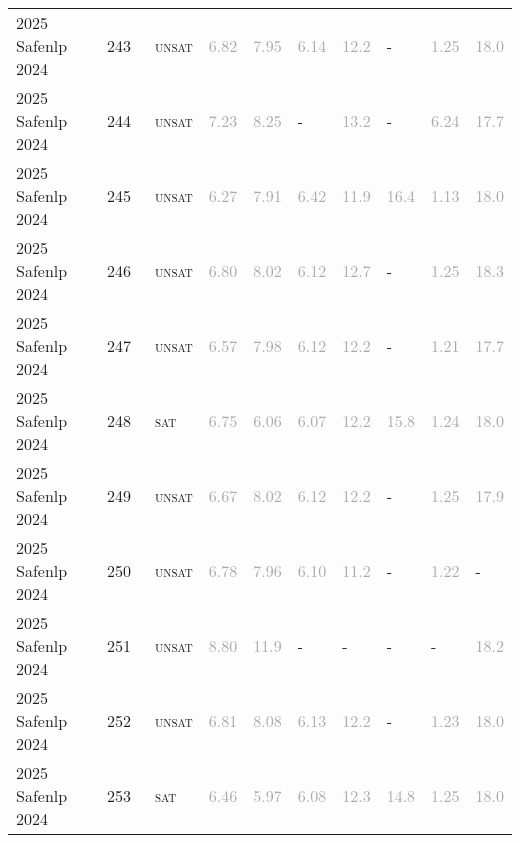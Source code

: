 \begin{center}
{\begin{longtable}{@{}llllllllll@{}}
2025 Safenlp 2024 & 243 & ~\textsc{unsat} & \textcolor{darkgray}{6.82} & \textcolor{darkgray}{7.95} & \textcolor{darkgray}{6.14} & \textcolor{darkgray}{12.2} & - & \textcolor{darkgray}{1.25} & \textcolor{darkgray}{18.0} \\
2025 Safenlp 2024 & 244 & ~\textsc{unsat} & \textcolor{darkgray}{7.23} & \textcolor{darkgray}{8.25} & - & \textcolor{darkgray}{13.2} & - & \textcolor{darkgray}{6.24} & \textcolor{darkgray}{17.7} \\
2025 Safenlp 2024 & 245 & ~\textsc{unsat} & \textcolor{darkgray}{6.27} & \textcolor{darkgray}{7.91} & \textcolor{darkgray}{6.42} & \textcolor{darkgray}{11.9} & \textcolor{darkgray}{16.4} & \textcolor{darkgray}{1.13} & \textcolor{darkgray}{18.0} \\
2025 Safenlp 2024 & 246 & ~\textsc{unsat} & \textcolor{darkgray}{6.80} & \textcolor{darkgray}{8.02} & \textcolor{darkgray}{6.12} & \textcolor{darkgray}{12.7} & - & \textcolor{darkgray}{1.25} & \textcolor{darkgray}{18.3} \\
2025 Safenlp 2024 & 247 & ~\textsc{unsat} & \textcolor{darkgray}{6.57} & \textcolor{darkgray}{7.98} & \textcolor{darkgray}{6.12} & \textcolor{darkgray}{12.2} & - & \textcolor{darkgray}{1.21} & \textcolor{darkgray}{17.7} \\
2025 Safenlp 2024 & 248 & ~\textsc{sat} & \textcolor{darkgray}{6.75} & \textcolor{darkgray}{6.06} & \textcolor{darkgray}{6.07} & \textcolor{darkgray}{12.2} & \textcolor{darkgray}{15.8} & \textcolor{darkgray}{1.24} & \textcolor{darkgray}{18.0} \\
2025 Safenlp 2024 & 249 & ~\textsc{unsat} & \textcolor{darkgray}{6.67} & \textcolor{darkgray}{8.02} & \textcolor{darkgray}{6.12} & \textcolor{darkgray}{12.2} & - & \textcolor{darkgray}{1.25} & \textcolor{darkgray}{17.9} \\
2025 Safenlp 2024 & 250 & ~\textsc{unsat} & \textcolor{darkgray}{6.78} & \textcolor{darkgray}{7.96} & \textcolor{darkgray}{6.10} & \textcolor{darkgray}{11.2} & - & \textcolor{darkgray}{1.22} & - \\
2025 Safenlp 2024 & 251 & ~\textsc{unsat} & \textcolor{darkgray}{8.80} & \textcolor{darkgray}{11.9} & - & - & - & - & \textcolor{darkgray}{18.2} \\
2025 Safenlp 2024 & 252 & ~\textsc{unsat} & \textcolor{darkgray}{6.81} & \textcolor{darkgray}{8.08} & \textcolor{darkgray}{6.13} & \textcolor{darkgray}{12.2} & - & \textcolor{darkgray}{1.23} & \textcolor{darkgray}{18.0} \\
2025 Safenlp 2024 & 253 & ~\textsc{sat} & \textcolor{darkgray}{6.46} & \textcolor{darkgray}{5.97} & \textcolor{darkgray}{6.08} & \textcolor{darkgray}{12.3} & \textcolor{darkgray}{14.8} & \textcolor{darkgray}{1.25} & \textcolor{darkgray}{18.0} \\

\end{longtable}}
\end{center}
